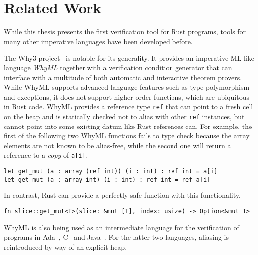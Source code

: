 \section{Related Work}
\label{sec:related}

While this thesis presents the first verification tool for Rust programs, tools
for many other imperative languages have been developed before.

The Why3 project~\cite{bobot2011why3} is notable for its generality. It provides
an imperative ML-like language \emph{WhyML} together with a verification
condition generator that can interface with a multitude of both automatic and
interactive theorem provers. While WhyML supports advanced language features such
as type polymorphism and exceptions, it does not support higher-order functions,
which are ubiquitous in Rust code.
WhyML provides a reference type \texttt{ref} that can point to a fresh cell on
the heap and is statically checked not to alias with other \texttt{ref}
instances, but cannot point into some existing datum like Rust references can.
For example, the first of the following two WhyML functions fails to type check
because the array elements are not known to be alias-free, while the second one
will return a reference to a \emph{copy} of \verb!a[i]!.

\begin{verbatim}
let get_mut (a : array (ref int)) (i : int) : ref int = a[i]
let get_mut (a : array int) (i : int) : ref int = ref a[i]
\end{verbatim}

In contrast, Rust can provide a perfectly safe function with this functionality.

\begin{verbatim}
fn slice::get_mut<T>(slice: &mut [T], index: usize) -> Option<&mut T>
\end{verbatim}

WhyML is also being used as an intermediate language for the verification of
programs in Ada~\cite{guitton2011hi}, C~\cite{cuoq2012frama} and Java~\cite{filliatre2007krakatoa}.
For the latter two languages, aliasing is reintroduced by way of an explicit heap.

